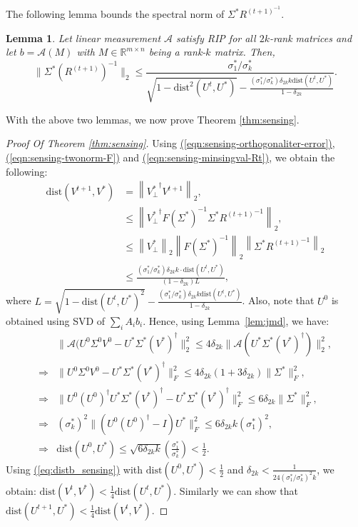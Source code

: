 \documentclass[11pt]{article}
\renewcommand{\eqref}[1]{\hyperref[#1]{(\ref*{#1})}}
\theoremstyle{plain}
\newtheorem{lemma}[theorem]{Lemma}
\theoremstyle{definition}
\newcommand{\rmn}{\mathbb{R}^{m \times n}}
\newcommand{\dist}{\mathrm{dist}}
\newcommand{\twonorm}[1]{\left\| {#1} \right\|_2}
\newcommand{\aff}{{\mathcal A}}
\begin{document}
The following lemma bounds the spectral norm of $\Sigma^*R^{(t+1)^{-1}}$.
\begin{lemma}\label{lemma:sensing-minsingval-Rt}
Let linear measurement $\aff$ satisfy RIP for all $2k$-rank matrices and let $b=\aff(M)$ with $M\in \rmn$ being a rank-$k$ matrix. Then, 
\begin{equation}\label{eqn:sensing-minsingval-Rt}
  \|\Sigma^*(R^{(t+1)})^{-1}\|_2\leq \frac{\sigma^*_1/\sigma^*_k}{\sqrt{1-\dist^2\left(U^{t},U^*\right)}-\frac{(\sigma^*_1/\sigma^*_k)\delta_{2k}k\dist(U^{t},U^*)}{1-\delta_{2k}}}.%
\end{equation}
\end{lemma}
With the above two lemmas, we now prove Theorem \ref{thm:sensing}.
\begin{proof}[Proof Of Theorem \ref{thm:sensing}]
  Using \eqref{eqn:sensing-orthogonaliter-error}, \eqref{eqn:sensing-twonorm-F} and \eqref{eqn:sensing-minsingval-Rt}, we
obtain the following:
\begin{align}
  \dist\left(V^{t+1},V^*\right) &= \twonorm{{V_{\perp}^*}^\dag V^{t+1}},\nonumber\\
	&\leq \twonorm{{V_{\perp}^*}^\dag F(\Sigma^*)^{-1}\Sigma^*{R^{(t+1)}}^{-1}}, \nonumber\\
	&\leq \twonorm{V_{\perp}^*}\twonorm{F(\Sigma^*)^{-1}}\twonorm{\Sigma^*{R^{(t+1)}}^{-1}} \nonumber\\
	&\leq \frac{(\sigma^*_1/\sigma^*_k)\delta_{2k} k \cdot \dist\left(U^{t},U^*\right)}{(1-\delta_{2k})L},\label{eq:distb_sensing}		
\end{align}
where $L= \sqrt{1-\dist\left(U^{t},U^*\right)^2} - 
			\frac{(\sigma^*_1/\sigma^*_k)\delta_{2k} k \dist\left(U^{t},U^*\right)}{1-\delta_{2k}}$. 
Also, note that $U^{0}$ is obtained using SVD of $\sum_i A_i b_i$. Hence, using Lemma~\ref{lem:jmd}, we have:
\begin{align}
& \|\aff(U^{0}\Sigma^{0}V^{0}-U^*\Sigma^*(V^*)^\dag\|_2^2\leq 4\delta_{2k}\|\aff(U^*\Sigma^*(V^*)^\dag)\|_2^2,\nonumber\\
\Rightarrow& \|U^{0}\Sigma^{0}V^{0}-U^*\Sigma^*(V^*)^\dag\|_F^2\leq 4\delta_{2k}(1+3\delta_{2k})\|\Sigma^*\|_F^2,\nonumber\\
\Rightarrow&\|U^{0}(U^{0})^\dag U^*\Sigma^*(V^*)^\dag-U^*\Sigma^*(V^*)^\dag\|_F^2\leq 6\delta_{2k}\|\Sigma^*\|_F^2,\nonumber\\
\Rightarrow&(\sigma_k^*)^2\|(U^{0}(U^{0})^\dag-I)U^*\|_F^2\leq 6\delta_{2k}k(\sigma_1^*)^2,\nonumber\\
\Rightarrow&\dist(U^{0}, U^*)\leq \sqrt{6\delta_{2k}k}\left(\frac{\sigma_1^*}{\sigma_k^*}\right)<\frac{1}{2}.
\end{align}
Using \eqref{eq:distb_sensing} with  $\dist\left(U^{0},U^*\right) < \frac{1}{2}$ and $\delta_{2k} < \frac{1}
{24(\sigma^*_1/\sigma^*_k)^2k}$, we obtain: $\dist\left(V^{t},V^*\right) < \frac{1}{4} \dist\left(U^{t},U^*\right)$.  
Similarly we can show that $\dist\left(U^{t+1},U^*\right) < \frac{1}{4} \dist\left(V^{t},V^*\right)$. 
\end{proof}
\end{document}
